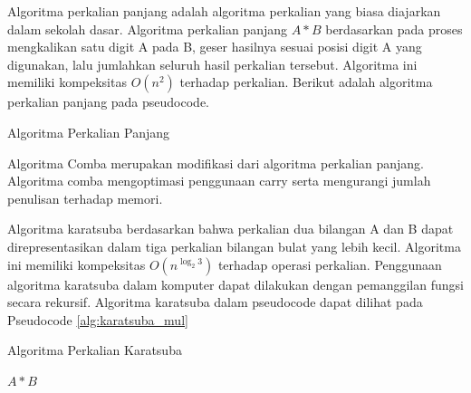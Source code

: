 Algoritma perkalian panjang adalah algoritma perkalian yang biasa diajarkan dalam sekolah dasar. Algoritma perkalian panjang $A*B$ berdasarkan pada proses mengkalikan satu digit A pada B, geser hasilnya sesuai posisi digit A yang digunakan, lalu jumlahkan seluruh hasil perkalian tersebut. Algoritma ini memiliki kompeksitas $O(n^2)$ terhadap perkalian. Berikut adalah algoritma perkalian panjang pada pseudocode.

\begin{algorithm}
  \caption{Algoritma Perkalian Panjang}
    \label{alg:mul}
  \begin{algorithmic}[1]
    \Statex
        \EndFor
      \EndFor
      \State {}
    \EndFunction
  \end{algorithmic}
\end{algorithm}

Algoritma Comba merupakan modifikasi dari algoritma perkalian panjang. Algoritma comba mengoptimasi penggunaan carry serta mengurangi jumlah penulisan terhadap memori.

Algoritma karatsuba berdasarkan bahwa perkalian dua bilangan A dan B dapat direpresentasikan dalam tiga perkalian bilangan bulat yang lebih kecil. Algoritma ini memiliki kompeksitas $O(n^{\log_2 3})$ terhadap operasi perkalian. Penggunaan algoritma karatsuba dalam komputer dapat dilakukan dengan pemanggilan fungsi secara rekursif. Algoritma karatsuba dalam pseudocode dapat dilihat pada Pseudocode \ref{alg:karatsuba_mul}

\begin{algorithm}
  \caption{Algoritma Perkalian Karatsuba}
  \label{alg:karatsuba_mul}
  \begin{algorithmic}[1]
    \Statex
        \State \Return $A * B$
      \EndIf
      \State

      \State {}
    \EndFunction
  \end{algorithmic}
\end{algorithm}


